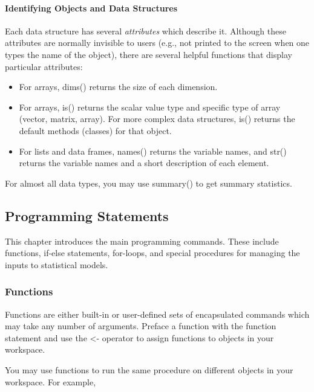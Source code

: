 \documentclass[letterpaper,10pt,english]{sphinxmanual}
\begin{document}
\paragraph{Identifying Objects and Data Structures}
\label{docs/user_guide:identifying-objects-and-data-structures}
Each data structure has several \emph{attributes} which describe it. Although
these attributes are normally invisible to users (e.g., not printed to
the screen when one types the name of the object), there are several
helpful functions that display particular attributes:
\begin{itemize}
\item {} 
For arrays, dims() returns the size of each dimension.

\item {} 
For arrays, is() returns the scalar value type and specific type of
array (vector, matrix, array). For more complex data structures, is()
returns the default methods (classes) for that object.

\item {} 
For lists and data frames, names() returns the variable names, and
str() returns the variable names and a short description of each
element.

\end{itemize}

For almost all data types, you may use summary() to get summary
statistics.


\subsection{Programming Statements}
\label{docs/user_guide:programming-statements}\label{docs/user_guide:userguide-programming-statements}
This chapter introduces the main programming commands. These include
functions, if-else statements, for-loops, and special procedures for
managing the inputs to statistical models.


\subsubsection{Functions}
\label{docs/user_guide:functions}
Functions are either built-in or user-defined sets of encapsulated
commands which may take any number of arguments. Preface a function with
the function statement and use the \textless{}- operator to assign functions to
objects in your workspace.

You may use functions to run the same procedure on different objects in
your workspace. For example,
\end{document}
